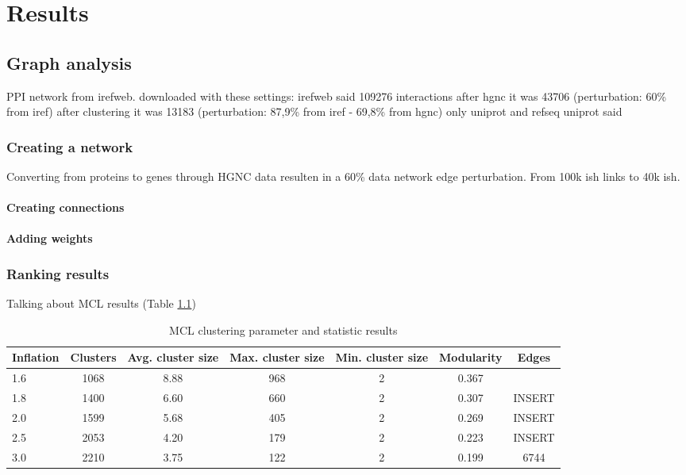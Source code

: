 \part{Results}
\label{pa:results}
\chapter{Graph analysis}
PPI network from irefweb.
downloaded with these settings: %
irefweb said 109276 interactions 
after hgnc it was 43706 (perturbation: 60\% from iref)
after clustering it was 13183 (perturbation: 87,9\% from iref - 69,8\% from hgnc) %
only uniprot and refseq
uniprot said
\section{Creating a network}
Converting from proteins to genes through HGNC data resulten in a 60\% data
network edge perturbation. From 100k ish links to 40k ish.
\subsection{Creating connections}
\subsection{Adding weights}
\section{Ranking results}
Talking about MCL results (Table \ref{tab:mcl-inflation})
\begin{table}
    \centering
    \begin{tabular}{| l | c | c | c | c | c | c |}
        \hline
        \textbf{Inflation} & \textbf{Clusters} & \textbf{Avg.
    cluster size} & \textbf{Max. cluster size} & \textbf{Min. cluster
    size} & \textbf{Modularity} & \textbf{Edges}\\
        \hline
        1.6 & 1068 & 8.88 & 968 & 2 & 0.367 \\
        1.8 & 1400 & 6.60 & 660 & 2 & 0.307 & INSERT \\
        2.0 & 1599 & 5.68 & 405 & 2 & 0.269 & INSERT \\
        2.5 & 2053 & 4.20 & 179 & 2 & 0.223 & INSERT \\
        3.0 & 2210 & 3.75 & 122 & 2 & 0.199 & 6744 \\
        \hline
    \end{tabular}
    \caption{MCL clustering parameter and statistic results}
    \label{tab:mcl-inflation}
\end{table}

